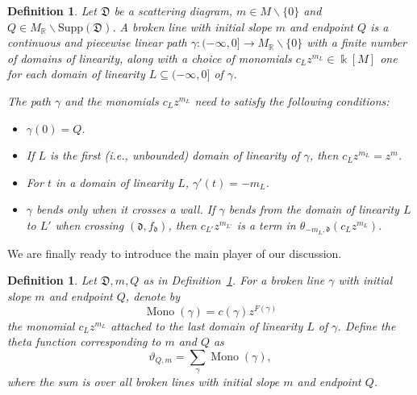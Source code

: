 \documentclass[12pt]{amsart}
\newtheorem{defn}[theorem]{Definition}
\theoremstyle{remark}
\numberwithin{equation}{section}
\newcommand{\RR}{\mathbb{R}}
\newcommand{\dd}{\mathfrak{d}}
\newcommand{\DD}{\mathfrak{D}}
\newcommand{\Mono}{\operatorname{Mono}}
\begin{document}
\begin{defn} 
  \label{brokendef}
  Let $\DD$ be a scattering diagram, $m \in M \backslash \{0\}$ and $Q \in
  M_{\RR} \backslash \text{Supp}(\DD)$.  A \emph{broken line} with initial slope
  $m$ and endpoint $Q$ is a continuous and piecewise linear path $\gamma : ( -
  \infty , 0] \rightarrow M_{\mathbb{R}} \backslash \{ 0\} $ with a finite
  number of domains of linearity, along with a choice of monomials $c_L z^{m_L}
  \in \Bbbk[M]$ one for each domain of linearity $L \subseteq ( - \infty, 0]$ of
  $\gamma$. 
  
  The path $\gamma$ and the monomials $c_L z^{m_L}$ need to satisfy the
  following conditions:
  \begin{itemize}
    \item 
      $\gamma(0) = Q$.
    
    \item 
      If $L$ is the first (i.e., unbounded) domain of linearity of $\gamma$,
      then $c_L z^{m_L} = z^{m}$.

    \item 
      For $t$ in a domain of linearity $L$, $\gamma'(t) = -m_L$.

    \item 
      $\gamma$ bends only when it crosses a wall. If $\gamma$ bends from the
      domain of linearity $L$ to $ L'$ when crossing $(\dd, f_{\dd})$, then
      $c_{L'}z^{m_{L'}}$ is a term in $\theta_{-m_L, \dd} (c_L z^{m_L})$.  
  \end{itemize}
\end{defn}

We are finally ready to introduce the main player of our discussion.
\begin{defn}
  Let $\DD, m, Q$ as in Definition~\ref{brokendef}. For a broken line $\gamma$
  with initial slope $m$ and endpoint $Q$, denote by 
  \[
    \Mono (\gamma) = c(\gamma)z^{F(\gamma)}
  \] 
  the monomial $c_L z^{m_L}$ attached to the last domain of linearity $L$ of
  $\gamma$. Define the \emph{theta function} corresponding to $m$ and $Q$ as
  \[ 
    \vartheta_{Q, m} = \sum_{\gamma} \Mono (\gamma), 
  \] 
  where the sum is over all broken lines with initial slope $m$ and endpoint
  $Q$.
\end{defn}
\end{document}
